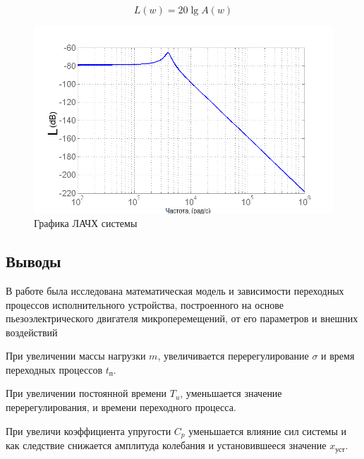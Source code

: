 \documentclass[a4paper, 12pt]{article}
\begin{document}
\begin{equation}
L(w) = 20\lg A(w)
\end{equation}

\begin{figure}[h]
	\centering
	\includegraphics[width=0.7\linewidth]{10}
	\caption{Графика ЛАЧХ системы}
	\label{}
\end{figure}
\newpage
\begin{center}
	\section*{Выводы}
\end{center}\par

В работе была исследована математическая модель и зависимости переходных процессов исполнительного устройства, построенного на основе пьезоэлектрического двигателя микроперемещений, от его параметров и внешних воздействий\par
При увеличении массы нагрузки $m$, увеличивается перерегулирование $\sigma$ и время переходных процессов $t_\text{п}$. \par
При увеличении постоянной времени $T_u$, уменьшается значение перерегулирования, и времени переходного процесса. \par
При увеличи коэффициента упругости $C_p$ уменьшается влияние сил системы и как следствие снижается амплитуда колебания и установившееся значение $x_\text{уст}$.
\end{document}
